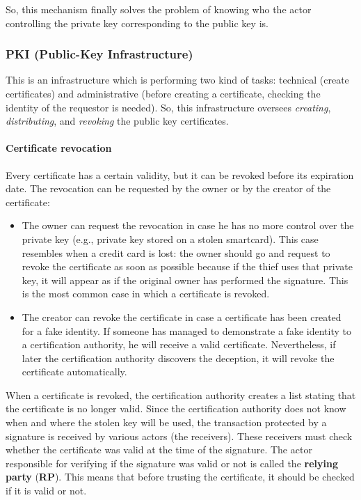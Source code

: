So, this mechanism finally solves the problem of knowing who the actor controlling the private key corresponding to the public key is.

\subsubsection{PKI (Public-Key Infrastructure)}
This is an infrastructure which is performing two kind of tasks: technical (create certificates) and
administrative (before creating a certificate, checking the identity of the requestor is needed). 
So, this infrastructure oversees \textit{creating}, \textit{distributing}, and \textit{revoking} the public key certificates.


\paragraph*{Certificate revocation}
Every certificate has a certain validity, but it can be revoked before its expiration date. The revocation can be requested by the owner or by the creator of the certificate:

\begin{itemize}
    \item The owner can request the revocation in case he has no more control over the private key (e.g., private key stored on a stolen smartcard). 
    This case resembles when a credit card is lost: the owner should go and request to revoke the certificate as soon as possible because if the thief uses that private key, it will appear as if the original owner has performed the signature. This is the most common case in which a certificate is revoked.
    
    \item The creator can revoke the certificate in case a certificate has been created for a fake identity. If someone has managed to demonstrate a fake identity to a certification authority, he will receive a valid certificate. Nevertheless, if later the certification authority discovers the deception, it will revoke the certificate automatically.
\end{itemize}

When a certificate is revoked, the certification authority creates a list stating that the certificate is no longer valid. Since the certification authority does not know when and where the stolen key will be used, the transaction protected by a signature is received by various actors (the receivers). These receivers must check whether the certificate was valid at the time of the signature. The actor responsible for verifying if the signature was valid or not is called the \textbf{relying party} (\textbf{RP}).
This means that before trusting the certificate, it should be checked if it is valid or not.

